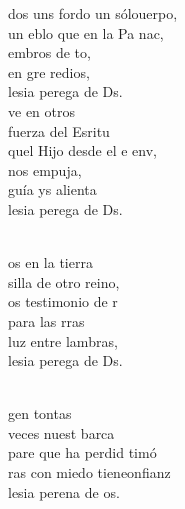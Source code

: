 \documentclass[12pt]{article}
\begin{document}
\begin{multicols*}{2}
\begin{cancion}%
	dos uns fordo un sólouerpo,\\
	un eblo que en la Pa nac,\\
	embros de to,\\
	en gre redios,\\
	lesia perega de Ds.\\
	ve en otros\\
	fuerza del Esritu \\
	quel Hijo desde el e env,\\
	 nos empuja,\\
	guía ys alienta\\
	lesia perega de Ds.\\\jump\\
	\begin{chorus}%
	os en la tierra \\
	silla de otro reino,\\
	os testimonio de r\\
	 para las rras\\
	luz entre lambras,\\
	lesia perega de Ds.\\
	\end{chorus}%
	\jump\\
	gen tontas \\
	 veces nuest barca\\
	pare que ha perdid timó\\
	ras con miedo tieneonfianz\\
	lesia perena de os.\\

\end{cancion}
\end{multicols*}
\end{document}
